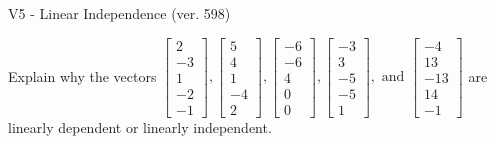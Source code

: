 \begin{exercise}
  \begin{exerciseTitle}V5 - Linear Independence (ver. 598)\end{exerciseTitle}
  \begin{exerciseStatement}
    Explain why the vectors \(\left[\begin{array}{r}
2 \\
-3 \\
1 \\
-2 \\
-1
\end{array}\right] , \left[\begin{array}{r}
5 \\
4 \\
1 \\
-4 \\
2
\end{array}\right] , \left[\begin{array}{r}
-6 \\
-6 \\
4 \\
0 \\
0
\end{array}\right] , \left[\begin{array}{r}
-3 \\
3 \\
-5 \\
-5 \\
1
\end{array}\right] , \text{ and } \left[\begin{array}{r}
-4 \\
13 \\
-13 \\
14 \\
-1
\end{array}\right]\) are linearly dependent or linearly independent.	



\end{exerciseStatement}
\end{exercise}
